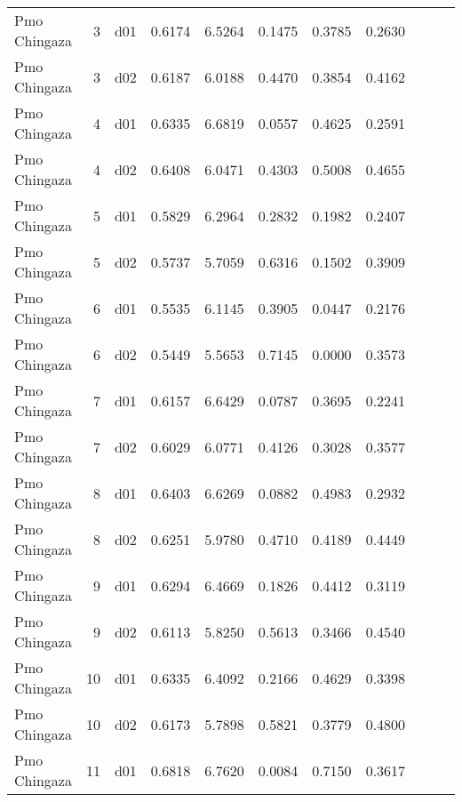 \begin{landscape}
\begin{longtable}{p{2cm}rrrrrrrrrr}
            Pmo Chingaza  &          3 &     d01 &   0.6174 &  6.5264 &        0.1475 &           0.3785 &  0.2630 \\
            Pmo Chingaza  &          3 &     d02 &   0.6187 &  6.0188 &        0.4470 &           0.3854 &  0.4162 \\
            Pmo Chingaza  &          4 &     d01 &   0.6335 &  6.6819 &        0.0557 &           0.4625 &  0.2591 \\
            Pmo Chingaza  &          4 &     d02 &   0.6408 &  6.0471 &        0.4303 &           0.5008 &  0.4655 \\
            Pmo Chingaza  &          5 &     d01 &   0.5829 &  6.2964 &        0.2832 &           0.1982 &  0.2407 \\
            Pmo Chingaza  &          5 &     d02 &   0.5737 &  5.7059 &        0.6316 &           0.1502 &  0.3909 \\
            Pmo Chingaza  &          6 &     d01 &   0.5535 &  6.1145 &        0.3905 &           0.0447 &  0.2176 \\
            Pmo Chingaza  &          6 &     d02 &   0.5449 &  5.5653 &        0.7145 &           0.0000 &  0.3573 \\
            Pmo Chingaza  &          7 &     d01 &   0.6157 &  6.6429 &        0.0787 &           0.3695 &  0.2241 \\
            Pmo Chingaza  &          7 &     d02 &   0.6029 &  6.0771 &        0.4126 &           0.3028 &  0.3577 \\
            Pmo Chingaza  &          8 &     d01 &   0.6403 &  6.6269 &        0.0882 &           0.4983 &  0.2932 \\
            Pmo Chingaza  &          8 &     d02 &   0.6251 &  5.9780 &        0.4710 &           0.4189 &  0.4449 \\
            Pmo Chingaza  &          9 &     d01 &   0.6294 &  6.4669 &        0.1826 &           0.4412 &  0.3119 \\
            Pmo Chingaza  &          9 &     d02 &   0.6113 &  5.8250 &        0.5613 &           0.3466 &  0.4540 \\
            Pmo Chingaza  &         10 &     d01 &   0.6335 &  6.4092 &        0.2166 &           0.4629 &  0.3398 \\
            Pmo Chingaza  &         10 &     d02 &   0.6173 &  5.7898 &        0.5821 &           0.3779 &  0.4800 \\
            Pmo Chingaza  &         11 &     d01 &   0.6818 &  6.7620 &        0.0084 &           0.7150 &  0.3617 \\

\end{longtable}
\end{landscape}
